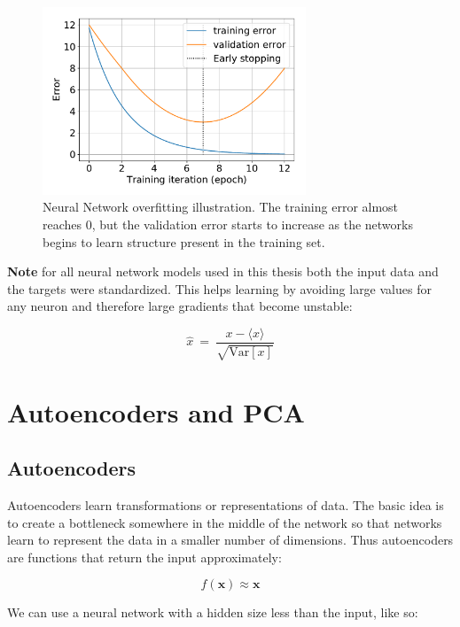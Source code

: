 \documentclass{article}
\newcommand{\vf}[1]{\mathbf{#1}}
\newcommand{\bx}{\vf{x}}
\begin{document}
\begin{figure}
    \centering
    \includegraphics[width=0.7\textwidth]{figures/overfitting_early_stopping}
    \caption[Overfitting illustration]{Neural Network overfitting illustration. The training error almost reaches $0$, but the validation error starts to increase as the networks begins to learn structure present  in the training set.}
    \label{fig:overfitting}
\end{figure}

\textbf{Note} for all neural network models used in this thesis both the input data and the targets were standardized. This helps learning by avoiding large values for any neuron and therefore large gradients that become unstable:

\begin{equation}
    \hat{x}\ =\ \frac{x - \langle x \rangle}{\sqrt{\text{Var}[x]}}
\end{equation}

\section{Autoencoders and PCA}
\subsection{Autoencoders}
Autoencoders learn transformations or representations of data. The basic idea is to create a bottleneck somewhere in the middle of the network so that networks learn to represent the data in a smaller number of dimensions. Thus autoencoders are functions that return the input approximately:

\begin{equation}
    f(\bx) \approx \bx
\end{equation}

We can use a neural network with a hidden size less than the input, like so:
\end{document}
